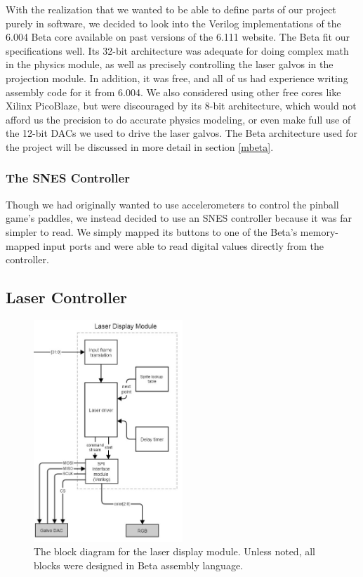 \documentclass{article}
\begin{document}
With the realization that we wanted to be able to define parts of our project purely in software, we decided to look into the Verilog implementations of the 6.004 Beta core available on past versions of the 6.111 website. The Beta fit our specifications well. Its 32-bit architecture was adequate for doing complex math in the physics module, as well as precisely controlling the laser galvos in the projection module. In addition, it was free, and all of us had experience writing assembly code for it from 6.004. We also considered using other free cores like Xilinx PicoBlaze, but were discouraged by its 8-bit architecture, which would not afford us the precision to do accurate physics modeling, or even make full use of the 12-bit DACs we used to drive the laser galvos. The Beta architecture used for the project will be discussed in more detail in section \ref{mbeta}.


\subsubsection{The SNES Controller}
Though we had originally wanted to use accelerometers to control the pinball game's paddles, we instead decided to use an SNES controller because it was far simpler to read. We simply mapped its buttons to one of the Beta's memory-mapped input ports and were able to read digital values directly from the controller.

\subsection{Laser Controller} \label{laser}

\begin{figure}[H]
\begin{center}
\includegraphics[width=0.5\textwidth]{laser}
\caption{The block diagram for the laser display module. Unless noted, all blocks were designed in Beta assembly language.}
\end{center}
\end{figure}
\end{document}

